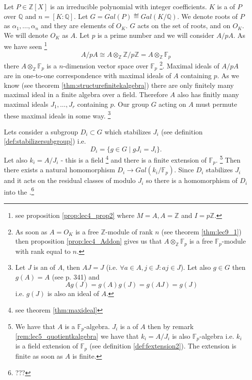Let $P \in \mathbb{Z}\left[X\right]$ is an irreducible polynomial with integer
coefficients. $K$ is a  of $P$ over
$\mathbb{Q}$ and $n = \left[K:\mathbb{Q}\right]$. Let
$G = Gal\left(P\right) \eqdef Gal\left(K/\mathbb{Q}\right)$. We denote
roots of $P$ as $\alpha_1, \dots, \alpha_n$ and they are elements of
$O_K$. $G$ acts on the set of roots, and on $O_K$. We will denote
$O_K$ as $A$. Let $p$ is a prime number and we will consider $A/pA$.
As we have seen
\footnote{
  see proposition \ref{prop:lec4_prop2} where $M = A, A=\mathbb{Z}$
  and $I = p\mathbb{Z}$.
}
\[
A/pA \cong A \otimes_{\mathbb{Z}} \mathbb{Z}/p\mathbb{Z} =
A \otimes_{\mathbb{Z}} \mathbb{F}_p
\]
there $A \otimes_{\mathbb{Z}} \mathbb{F}_p$ is a 
$n$-dimension vector space over $\mathbb{F}_p$
\footnote{
  As soon as $A=O_K$ is a free
  $\mathbb{Z}$-module of rank $n$ (see theorem \ref{thm:lec9_1}) then
  proposition 
  \ref{prop:lec4_Addon} gives us that $A \otimes_{\mathbb{Z}}
  \mathbb{F}_p$ is a free $\mathbb{F}_p$-module with rank equal
  to $n$.
}.
Maximal ideals
of $A/pA$ are in one-to-one correspondence with maximal ideals of $A$
containing $p$. As we know (see theorem
\ref{thm:structurefinitekalgebra}) there are only finitely many
maximal ideal in a finite algebra over a field. Therefore $A$ also has
finitly many 
maximal ideals $J_1, \dots, J_r$ containing $p$. Our group $G$ acting
on $A$ must permute these maximal ideals in some way.
\footnote{
  Let $J$ is an  of $A$, then $A J = J$
  (i.e. $\forall a \in A, j \in J: aj \in J$). Let also $g \in G$ then
  $g\left(A\right) = A$ (see \cite{bib:lang} p. 341) and
  \[
  A g\left(J\right) = g\left(A\right) g\left(J\right) =
  g\left(AJ\right) = g\left(J\right)
  \]
  i.e. $g\left(J\right)$ is also an ideal of $A$.
}

Lets consider a subgroup $D_i \subset G$ which stabilizes $J_i$ (see
definition \ref{def:stabilizersubgroup}) i.e.
\[
D_i = \{g \in G \mid g J_i = J_i\}.
\]
Let also $k_i = A/J_i$ - this is a field
\footnote{
  see theorem \ref{thm:maxideal}
}
and there is a finite
extension of $\mathbb{F}_p$.
\footnote{
  We have that $A$ is a $\mathbb{F}_p$-algebra. $J_i$ is a
   of $A$ then by remark
  \ref{rem:lec5_quotientkalgebra} we have that $k_i = A/J_i$ is also
  $\mathbb{F}_p$-algebra i.e. $k_i$ is a field extension of
  $\mathbb{F}_p$ (see definition \ref{def:fextension2}). The extension
  is finite as soon as $A$ is finite.
}
Then there exists a natural homomorphism
\(
D_i \to Gal\left(k_i/\mathbb{F}_p\right)
\).
Since $D_i$ stabilizes $J_i$ and it acts on the residual classes of
modulo $J_i$ so there is a homomorphism of $D_i$ into the
.\footnote{
  ???
}


